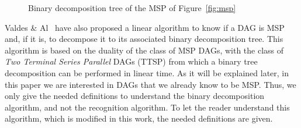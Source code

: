 \begin{figure}[h!]
\begin{center}
  \caption{Binary decomposition tree of the MSP of Figure~\ref{fig:msp}}
  \label{fig:t}
\end{center}
\end{figure}

Valdes \& Al~\cite{Valdes:1979:RSP:800135.804393} have also proposed a linear algorithm to know if a DAG is MSP and, if it is, to decompose it to its associated binary decomposition tree. This algorithm is based on the duality of the class of MSP DAGs, with the class of \emph{Two Terminal Series Parallel} DAGs (TTSP) from which a binary tree decomposition can be performed in linear time. As it will be explained later, in this paper we are interested in DAGs that we already know to be MSP. Thus, we only give the needed definitions to understand the binary decomposition algorithm, and not the recognition algorithm. To let the reader understand this algorithm, which is modified in this work, the needed definitions are given. 


